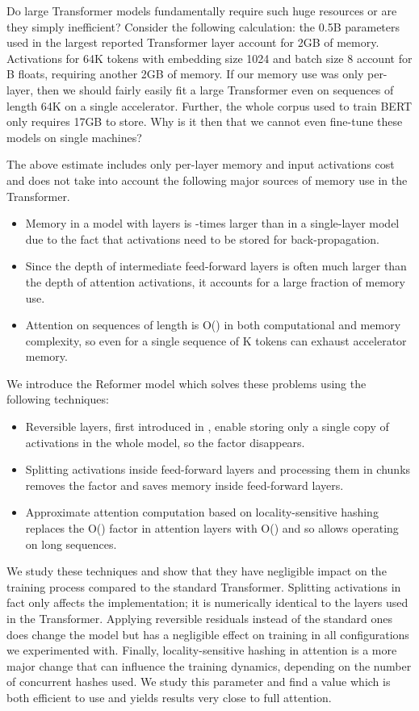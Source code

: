 \documentclass{article} \usepackage{iclr2020_conference,times}
\begin{document}
Do large Transformer models fundamentally require such huge resources or are
they simply inefficient? Consider the following calculation: the 0.5B parameters used in the largest reported Transformer layer account for 2GB of memory. Activations for 64K tokens with embedding size 1024 and batch size 8 account for B floats, requiring another 2GB of memory. If our memory use was only per-layer, then we should fairly easily fit a large Transformer even on sequences of length 64K on a single accelerator. Further, the whole corpus used to train BERT only requires 17GB to store. Why is it then that we cannot even fine-tune these models on single machines?

The above estimate includes only per-layer memory and input activations cost and does 
not take into account the following major sources of memory use in the Transformer.
\begin{itemize}
\item Memory in a model with  layers is -times larger than in a single-layer model due to
  the fact that activations need to be stored for back-propagation.
\item Since the depth  of intermediate feed-forward layers is often much larger than
  the depth  of attention activations, it accounts for a large fraction of memory use.
\item Attention on sequences of length  is O() in both computational and memory complexity,
  so even for a single sequence of K tokens can exhaust accelerator memory.
\end{itemize}

We introduce the Reformer model which solves these problems using the following techniques:
\begin{itemize}
\item Reversible layers, first introduced in \cite{gomez2017reversible}, enable storing only a single copy of activations in the whole model, so the  factor disappears.
\item Splitting activations inside feed-forward layers and processing them in chunks removes the  factor and saves memory inside feed-forward layers.
\item Approximate attention computation based on locality-sensitive hashing replaces the O() factor in attention layers with O() and so allows operating on long sequences.
\end{itemize}

We study these techniques and show that they have negligible impact on the training process compared to the standard Transformer. 
Splitting activations in fact only affects the implementation; it is numerically identical to the layers used in the Transformer. 
Applying reversible residuals instead of the standard ones does change the model but has a negligible effect on training in all 
configurations we experimented with.  Finally, locality-sensitive hashing in attention is a more major change that can influence
the training dynamics, depending on the number of concurrent hashes used.  We study this
parameter and find a value which is both efficient to use and yields results very close to full attention.
\end{document}
